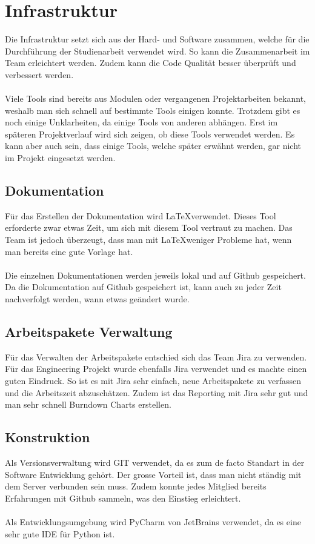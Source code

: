 \section{Infrastruktur}
Die Infrastruktur setzt sich aus der Hard- und Software zusammen, welche für die Durchführung der Studienarbeit verwendet wird. So kann die Zusammenarbeit im Team erleichtert werden. Zudem kann die Code Qualität besser überprüft und verbessert werden.
\\
\\
Viele Tools sind bereits aus Modulen oder vergangenen Projektarbeiten bekannt, weshalb man sich schnell auf bestimmte Tools einigen konnte. Trotzdem gibt es noch einige Unklarheiten, da einige Tools von anderen abhängen. Erst im späteren Projektverlauf wird sich zeigen, ob diese Tools verwendet werden. Es kann aber auch sein, dass einige Tools, welche später erwähnt werden, gar nicht im Projekt eingesetzt werden.

\subsection{Dokumentation}
Für das Erstellen der Dokumentation wird \LaTeX verwendet. Dieses Tool erforderte zwar etwas Zeit, um sich mit diesem Tool vertraut zu machen. Das Team ist jedoch überzeugt, dass man mit \LaTeX weniger Probleme hat, wenn man bereits eine gute Vorlage hat.
\\
\\
Die einzelnen Dokumentationen werden jeweils lokal und auf Github gespeichert. Da die Dokumentation auf Github gespeichert ist, kann auch zu jeder Zeit nachverfolgt werden, wann etwas geändert wurde.

\subsection{Arbeitspakete Verwaltung}
Für das Verwalten der Arbeitspakete entschied sich das Team Jira zu verwenden. Für das Engineering Projekt wurde ebenfalls Jira verwendet und es machte einen guten Eindruck. So ist es mit Jira sehr einfach, neue Arbeitspakete zu verfassen und die Arbeitszeit abzuschätzen. Zudem ist das Reporting mit Jira sehr gut und man sehr schnell Burndown Charts erstellen.

\subsection{Konstruktion}
Als Versionsverwaltung wird GIT verwendet, da es zum de facto Standart in der Software Entwicklung gehört. Der grosse Vorteil ist, dass man nicht ständig mit dem Server verbunden sein muss. Zudem konnte jedes Mitglied bereits Erfahrungen mit Github sammeln, was den Einstieg erleichtert.
\\
\\
Als Entwicklungsumgebung wird PyCharm von JetBrains verwendet, da es eine sehr gute IDE für Python ist.

